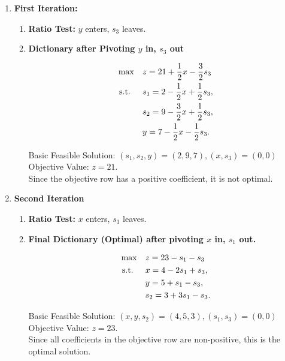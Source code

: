 \begin{enumerate}
    \item \textbf{First Iteration:}
\begin{enumerate}
    \item \textbf{Ratio Test:} \( y \) enters, \( s_3 \) leaves.

    \item \textbf{Dictionary after Pivoting \( y \) in, \( s_3 \) out}  
    \begin{tcolorbox}[colback=blue!5!white, colframe=blue!75!black,    
    width=0.6\textwidth, %
    box align=center, 
    title=\textbf{Second Dictionary}]
    \[
    \begin{aligned}
    \max \quad & z = 21 + \frac{1}{2}x - \frac{3}{2}s_3 \\
    \mbox{ s.t. } \quad 
    & s_1 = 2 - \frac{1}{2}x + \frac{1}{2}s_3, \\
    & s_2 = 9 - \frac{3}{2}x + \frac{1}{2}s_3, \\
    & y = 7 - \frac{1}{2}x - \frac{1}{2}s_3.
    \end{aligned}
    \]
    \end{tcolorbox}
    Basic Feasible Solution: \( (s_1, s_2, y) = (2,9,7), (x,s_3) = (0,0) \)  
    Objective Value: \( z = 21 \).\\ 
    Since the objective row has a positive coefficient, it is not optimal.  
    \end{enumerate}
    \item \textbf{Second Iteration}
    \begin{enumerate}
    \item \textbf{Ratio Test:} \( x \) enters, \( s_1 \) leaves.

    \item \textbf{Final Dictionary (Optimal) after pivoting $x$ in, $s_1$ out.} 
    \begin{tcolorbox}[colback=green!5!white, colframe=green!75!black,    
    width=0.6\textwidth, %
    box align=center, 
    title=\textbf{Final Dictionary}] 
    \[
    \begin{aligned}
    \max \quad & z = 23 - s_1 - s_3 \\
    \mbox{ s.t. } \quad
    & x = 4 - 2s_1 + s_3, \\
    & y = 5 + s_1 - s_3, \\
    & s_2 = 3 + 3s_1 - s_3.
    \end{aligned}
    \]
    \end{tcolorbox}
    Basic Feasible Solution: \( (x,y,s_2) = (4,5,3), (s_1,s_3) = (0,0) \)  
    Objective Value: \( z = 23 \).\\ 
    Since all coefficients in the objective row are non-positive, this is the optimal solution.
    \end{enumerate}
\end{enumerate}

